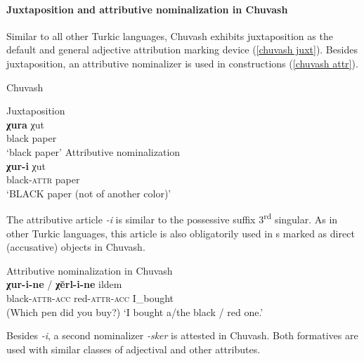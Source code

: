 \paragraph*{Juxtaposition and attributive nominalization in Chuvash}
\label{chuvash synchr}
Similar to all other Turkic languages, Chuvash exhibits juxtaposition as the default and general adjective attribution marking device (\ref{chuvash juxt}). Besides juxtaposition, an attributive nominalizer is used in  constructions (\ref{chuvash attr}).
\begin{exe}
\ex	
\rm{Chuvash \citep{clark1998a}}
\begin{xlist}
\ex 	
\label{chuvash juxt}
\rm{Juxtaposition}\\
\gll	\textbf{χura} χut\\
	black paper\\
\glt	‘black paper’
\ex	
\label{chuvash attr}
\rm{Attributive nominalization}\\
\gll	\textbf{χur-i} χut\\					 		
	black-\textsc{attr} paper\\
\glt	‘BLACK paper (not of another color)’
\end{xlist}
\end{exe}
The attributive article \textit{-i} is similar to the possessive suffix 3\textsuperscript{rd} singular. As in other Turkic languages, this article is also obligatorily used in s marked as direct (accusative) objects in Chuvash.
\begin{exe}
\ex 
\label{chuvash headless acc}	
\rm{Attributive nominalization in Chuvash \citep[7]{benzing1993b}}\\
\gll	\textbf{χur-i-ne} / \textbf{χĕrl-i-ne} ildem\\
 	black-\textsc{attr}-\textsc{acc} { } red-\textsc{attr}-\textsc{acc} I\_bought\\
\glt 	(Which pen did you buy?) ‘I bought a/the black / red one.’
\end{exe}
Besides \textit{-i}, a second nominalizer \textit{-sker} is attested in Chuvash. Both formatives are used with similar classes of adjectival and other attributes.
